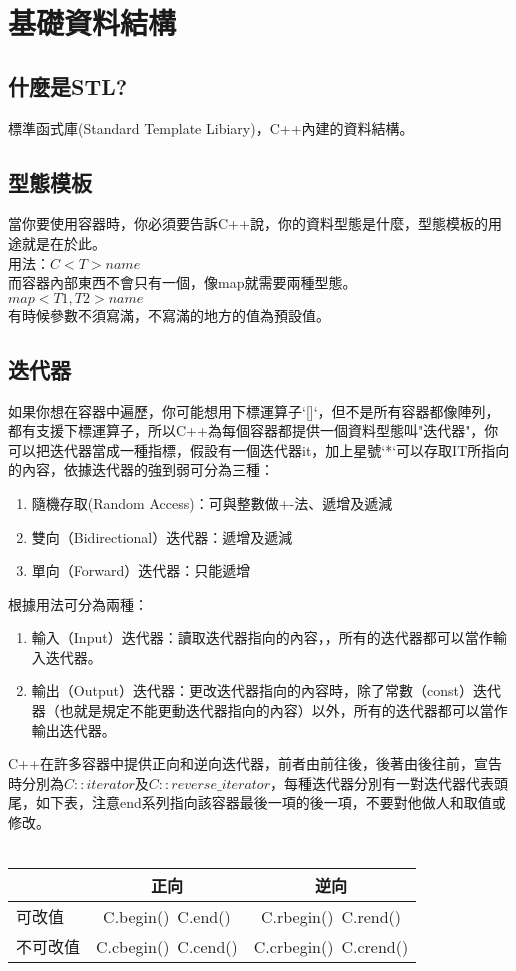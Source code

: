 \section{基礎資料結構}
\subsection{什麼是STL?}
標準函式庫(Standard Template Libiary)，C++內建的資料結構。
\subsection{型態模板}
當你要使用容器時，你必須要告訴C++說，你的資料型態是什麼，型態模板的用途就是在於此。\\
用法：$C <T> name$\\
而容器內部東西不會只有一個，像map就需要兩種型態。\\
$map <T1, T2> name$\\
有時候參數不須寫滿，不寫滿的地方的值為預設值。
\subsection{迭代器}
如果你想在容器中遍歷，你可能想用下標運算子`[]`，但不是所有容器都像陣列，都有支援下標運算子，所以C++為每個容器都提供一個資料型態叫"迭代器"，你可以把迭代器當成一種指標，假設有一個迭代器it，加上星號`*`可以存取IT所指向的內容，依據迭代器的強到弱可分為三種：
\begin{enumerate}
\item 隨機存取(Random Access)：可與整數做+-法、遞增及遞減
\item 雙向（Bidirectional）迭代器：遞增及遞減
\item 單向（Forward）迭代器：只能遞增
\end{enumerate}
根據用法可分為兩種：
\begin{enumerate}
\item 輸入（Input）迭代器：讀取迭代器指向的內容，，所有的迭代器都可以當作輸入迭代器。
\item 輸出（Output）迭代器：更改迭代器指向的內容時，除了常數（const）迭代器（也就是規定不能更動迭代器指向的內容）以外，所有的迭代器都可以當作輸出迭代器。
\end{enumerate}
C++在許多容器中提供正向和逆向迭代器，前者由前往後，後著由後往前，宣告時分別為$C::iterator$及$ C::reverse\_iterator$，每種迭代器分別有一對迭代器代表頭尾，如下表，注意end系列指向該容器最後一項的後一項，不要對他做人和取值或修改。\\ \\
\begin{tabular}{|l|c|c|}
	\hline &正向&逆向 \\
	\hline 可改值&C.begin()\ C.end()&C.rbegin()\ C.rend()\\
	\hline 不可改值&C.cbegin()\ C.cend()&C.crbegin()\ C.crend()\\
    \hline
\end{tabular}
